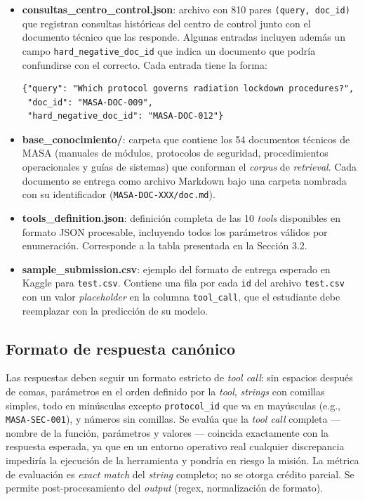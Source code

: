 \documentclass{article}
\begin{document}
\begin{itemize}
    \item \textbf{consultas\_centro\_control.json}: archivo con 810 pares \texttt{(query, doc\_id)} que registran consultas históricas del centro de control junto con el documento técnico que las responde. Algunas entradas incluyen además un campo \texttt{hard\_negative\_doc\_id} que indica un documento que podría confundirse con el correcto. Cada entrada tiene la forma:
    \begin{lstlisting}
{"query": "Which protocol governs radiation lockdown procedures?",
 "doc_id": "MASA-DOC-009",
 "hard_negative_doc_id": "MASA-DOC-012"}
    \end{lstlisting}

    \item \textbf{base\_conocimiento/}: carpeta que contiene los 54 documentos técnicos de MASA (manuales de módulos, protocolos de seguridad, procedimientos operacionales y guías de sistemas) que conforman el \textit{corpus} de \textit{retrieval}. Cada documento se entrega como archivo Markdown bajo una carpeta nombrada con su identificador (\texttt{MASA-DOC-XXX/doc.md}).

    \item \textbf{tools\_definition.json}: definición completa de las 10 \textit{tools} disponibles en formato JSON procesable, incluyendo todos los parámetros válidos por enumeración. Corresponde a la tabla presentada en la Sección 3.2.

    \item \textbf{sample\_submission.csv}: ejemplo del formato de entrega esperado en Kaggle para \texttt{test.csv}. Contiene una fila por cada \texttt{id} del archivo \texttt{test.csv} con un valor \textit{placeholder} en la columna \texttt{tool\_call}, que el estudiante debe reemplazar con la predicción de su modelo.
\end{itemize}

\subsection{Formato de respuesta canónico}


Las respuestas deben seguir un formato estricto de \textit{tool call}: sin espacios después de comas, parámetros en el orden definido por la \textit{tool}, \textit{strings} con comillas simples, todo en minúsculas excepto \texttt{protocol\_id} que va en mayúsculas (e.g., \texttt{MASA-SEC-001}), y números sin comillas. Se evalúa que la \textit{tool call} completa --- nombre de la función, parámetros y valores --- coincida exactamente con la respuesta esperada, ya que en un entorno operativo real cualquier discrepancia impediría la ejecución de la herramienta y pondría en riesgo la misión. La métrica de evaluación es \textit{exact match} del \textit{string} completo; no se otorga crédito parcial. Se permite post-procesamiento del \textit{output} (regex, normalización de formato).\\
\end{document}
